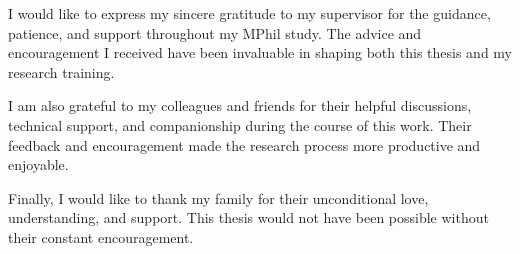 \begin{acknowledgements}
I would like to express my sincere gratitude to my supervisor for the guidance,
patience, and support throughout my MPhil study. The advice and encouragement I
received have been invaluable in shaping both this thesis and my research
training.

I am also grateful to my colleagues and friends for their helpful discussions,
technical support, and companionship during the course of this work. Their
feedback and encouragement made the research process more productive and
enjoyable.

Finally, I would like to thank my family for their unconditional love,
understanding, and support. This thesis would not have been possible without
their constant encouragement.
\end{acknowledgements}
